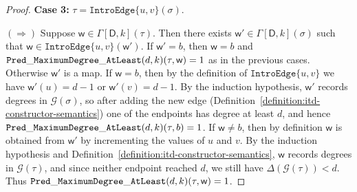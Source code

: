 \documentclass[11pt,a4paper]{article}
\newcommand{\truevalue}{1}
\newcommand{\treewidthvalue}{k}
\newcommand{\decompositiongraph}[1]{\mathcal{G}(#1)}
\newcommand{\maxDegree}{\Delta}
\newcommand{\introedgetype}[2]{\mathtt{IntroEdge}\{#1,#2\}}
\newcommand{\introedgegeneric}[2]{\mathtt{IntroEdge}\{#1,#2\}}
\newcommand{\abstractdecomposition}{\tau}
\newcommand{\sigmaabstractdecomposition}{\sigma}
\newcommand{\vertexone}{u}
\newcommand{\vertextwo}{v}
\newcommand{\awitness}{\mathsf{w}}
\newcommand{\dpcore}{\mathsf{D}}
\newcommand{\dpNamePart}[1]{\mbox{\normalfont\ttfamily #1}}
\newcommand{\predicateMaxDegree}[2]{\dpNamePart{Pred}\_\allowbreak\dpNamePart{MaximumDegree}\_\allowbreak\dpNamePart{AtLeast}(#1,#2)}
\newcommand{\dynamizationfunctionname}[1]{\Gamma[{#1}]}
\newcommand{\dynamizationfunction}[2]{\dynamizationfunctionname{#1,#2}}
\newcommand{\maxdegreeparameter}{d}
\newcommand{\maxdegreefound}{b}
\newcommand{\mxdp}{\predicateMaxDegree{\maxdegreeparameter}{\treewidthvalue}}
\begin{document}
{\begin{proof}
\medskip
\noindent\textbf{Case 3:} $\abstractdecomposition=\introedgetype{\vertexone}{\vertextwo}(\sigmaabstractdecomposition)$.

$(\Rightarrow)$ Suppose $\awitness\in \dynamizationfunction{\dpcore}{\treewidthvalue}(\abstractdecomposition)$. Then there exists $\awitness'\in \dynamizationfunction{\dpcore}{\treewidthvalue}(\sigmaabstractdecomposition)$ such that $\awitness\in \introedgegeneric{\vertexone}{\vertextwo}(\awitness')$. If $\awitness'=\maxdegreefound$, then $\awitness=\maxdegreefound$ and $\mxdp(\abstractdecomposition,\awitness)=\truevalue$ as in the previous cases. Otherwise $\awitness'$ is a map. If $\awitness=\maxdegreefound$, then by the definition of $\introedgegeneric{\vertexone}{\vertextwo}$ we have $\awitness'(\vertexone)=\maxdegreeparameter-1$ or $\awitness'(\vertextwo)=\maxdegreeparameter-1$. By the induction hypothesis, $\awitness'$ records degrees in $\decompositiongraph{\sigmaabstractdecomposition}$, so after adding the new edge (Definition~\ref{definition:itd-constructor-semantics}) one of the endpoints has degree at least $\maxdegreeparameter$, and hence $\mxdp(\abstractdecomposition,\maxdegreefound)=\truevalue$. If $\awitness\neq \maxdegreefound$, then by definition $\awitness$ is obtained from $\awitness'$ by incrementing the values of $\vertexone$ and $\vertextwo$. By the induction hypothesis and Definition~\ref{definition:itd-constructor-semantics}, $\awitness$ records degrees in $\decompositiongraph{\abstractdecomposition}$, and since neither endpoint reached $\maxdegreeparameter$, we still have $\maxDegree(\decompositiongraph{\abstractdecomposition})<\maxdegreeparameter$. Thus $\mxdp(\abstractdecomposition,\awitness)=\truevalue$.


\end{proof}}
\end{document}
